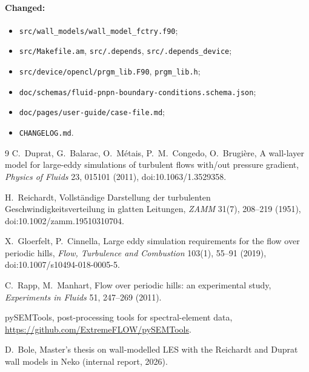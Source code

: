 \documentclass[11pt,a4paper]{article}
\newcommand{\code}[1]{\texttt{#1}}
\begin{document}
\paragraph{Changed:}
\begin{itemize}
  \item \code{src/wall\_models/wall\_model\_fctry.f90};
  \item \code{src/Makefile.am}, \code{src/.depends},
    \code{src/.depends\_device};
  \item \code{src/device/opencl/prgm\_lib.F90}, \code{prgm\_lib.h};
  \item \code{doc/schemas/fluid-pnpn-boundary-conditions.schema.json};
  \item \code{doc/pages/user-guide/case-file.md};
  \item \code{CHANGELOG.md}.
\end{itemize}

\begin{thebibliography}{9}
C.~Duprat, G.~Balarac, O.~Métais, P.~M.~Congedo, O.~Brugière,
\newblock A wall-layer model for large-eddy simulations of turbulent flows
with/out pressure gradient,
\newblock \emph{Physics of Fluids} 23, 015101 (2011),
\newblock doi:10.1063/1.3529358.

H.~Reichardt,
\newblock Vollständige Darstellung der turbulenten Geschwindigkeitsverteilung
in glatten Leitungen,
\newblock \emph{ZAMM} 31(7), 208--219 (1951),
\newblock doi:10.1002/zamm.19510310704.

X.~Gloerfelt, P.~Cinnella,
\newblock Large eddy simulation requirements for the flow over periodic
hills,
\newblock \emph{Flow, Turbulence and Combustion} 103(1), 55--91 (2019),
\newblock doi:10.1007/s10494-018-0005-5.

C.~Rapp, M.~Manhart,
\newblock Flow over periodic hills: an experimental study,
\newblock \emph{Experiments in Fluids} 51, 247--269 (2011).

pySEMTools, post-processing tools for spectral-element data,
\url{https://github.com/ExtremeFLOW/pySEMTools}.

D.~Bole,
\newblock Master's thesis on wall-modelled LES with the Reichardt and Duprat
wall models in Neko (internal report, 2026).
\end{thebibliography}
\end{document}

